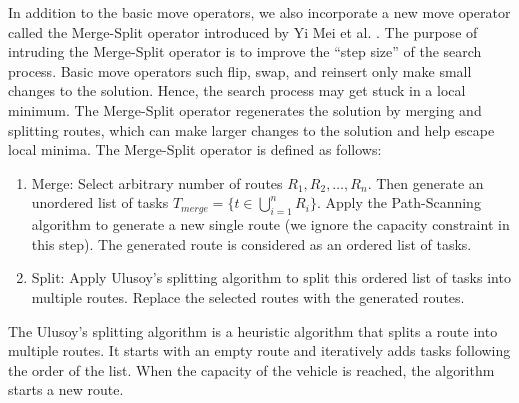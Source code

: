 \documentclass[conference]{IEEEtran}
\begin{document}
In addition to the basic move operators, we also incorporate a new move operator called the Merge-Split operator introduced by Yi Mei et al. \cite{MEANS}.
The purpose of intruding the Merge-Split operator is to improve the ``step size'' of the search process.
Basic move operators such flip, swap, and reinsert only make small changes to the solution.
Hence, the search process may get stuck in a local minimum.
The Merge-Split operator regenerates the solution by merging and splitting routes, which can make larger changes to the solution and help escape local minima.
The Merge-Split operator is defined as follows:
\begin{enumerate}
    \item Merge: Select arbitrary number of routes $R_1, R_2, \ldots, R_n$. 
        Then generate an unordered list of tasks $T_{merge} = \{t \in \bigcup_{i=1}^{n} R_i\}$.
        Apply the Path-Scanning algorithm to generate a new single route (we ignore the capacity constraint in this step).
        The generated route is considered as an ordered list of tasks.
    \item Split: Apply Ulusoy's splitting algorithm to split this ordered list of tasks into multiple routes.
        Replace the selected routes with the generated routes.
\end{enumerate}

The Ulusoy's splitting algorithm is a heuristic algorithm that splits a route into multiple routes.
It starts with an empty route and iteratively adds tasks following the order of the list.
When the capacity of the vehicle is reached, the algorithm starts a new route.
\end{document}
